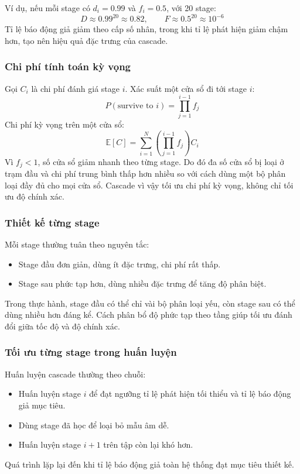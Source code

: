Ví dụ, nếu mỗi stage có $d_i=0.99$ và $f_i=0.5$, với 20 stage:
\[
D \approx 0.99^{20}\approx 0.82,\qquad
F \approx 0.5^{20}\approx 10^{-6}
\]
Tỉ lệ báo động giả giảm theo cấp số nhân, trong khi tỉ lệ phát hiện giảm chậm hơn, tạo nên hiệu quả đặc trưng của cascade.  \cite{viola2001rapid}

\subsubsection{Chi phí tính toán kỳ vọng}

Gọi $C_i$ là chi phí đánh giá stage $i$.
Xác suất một cửa sổ đi tới stage $i$:
\[
P(\text{survive to } i)=\prod_{j=1}^{i-1} f_j
\]
Chi phí kỳ vọng trên một cửa sổ:
\[
\mathbb{E}[C]=\sum_{i=1}^{N}
\left(\prod_{j=1}^{i-1} f_j\right) C_i
\]
Vì $f_j<1$, số cửa sổ giảm nhanh theo từng stage.
Do đó đa số cửa sổ bị loại ở trạm đầu và chi phí trung bình thấp hơn nhiều so với cách dùng một bộ phân loại đầy đủ cho mọi cửa sổ.
Cascade vì vậy tối ưu chi phí kỳ vọng, không chỉ tối ưu độ chính xác.  \cite{viola2001rapid,li2012facechapter}

\subsubsection{Thiết kế từng stage}

Mỗi stage thường tuân theo nguyên tắc:
\begin{itemize}
  \item Stage đầu đơn giản, dùng ít đặc trưng, chi phí rất thấp.
  \item Stage sau phức tạp hơn, dùng nhiều đặc trưng để tăng độ phân biệt.
\end{itemize}
Trong thực hành, stage đầu có thể chỉ vài bộ phân loại yếu, còn stage sau có thể dùng nhiều hơn đáng kể.
Cách phân bổ độ phức tạp theo tầng giúp tối ưu đánh đổi giữa tốc độ và độ chính xác.

\subsubsection{Tối ưu từng stage trong huấn luyện}

Huấn luyện cascade thường theo chuỗi:
\begin{itemize}
  \item Huấn luyện stage $i$ để đạt ngưỡng tỉ lệ phát hiện tối thiểu và tỉ lệ báo động giả mục tiêu.
  \item Dùng stage đã học để loại bỏ mẫu âm dễ.
  \item Huấn luyện stage $i+1$ trên tập còn lại khó hơn.
\end{itemize}
Quá trình lặp lại đến khi tỉ lệ báo động giả toàn hệ thống đạt mục tiêu thiết kế.  \cite{viola2001rapid,viola2004robust}

